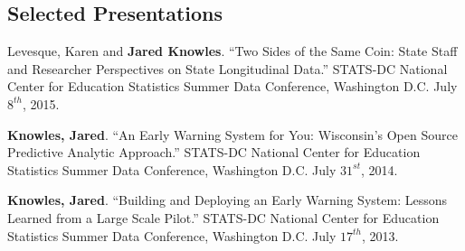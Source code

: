 \documentclass[margin,line]{res}
\begin{document}
\begin{resume}
\section{\sc Selected Presentations}

Levesque, Karen and \textbf{Jared Knowles}. ``Two Sides of the Same Coin: State 
Staff and Researcher Perspectives on State Longitudinal Data.'' STATS-DC National Center for Education Statistics Summer Data Conference, Washington D.C. July $8^{th}$, 2015.


\textbf{Knowles, Jared}. ``An Early Warning System for You: Wisconsin’s Open Source Predictive Analytic Approach.'' STATS-DC National Center for Education Statistics Summer Data Conference, Washington D.C. July $31^{st}$, 2014.


\textbf{Knowles, Jared}. ``Building and Deploying an Early Warning System: Lessons Learned from a Large Scale Pilot.'' STATS-DC National Center for Education Statistics Summer Data Conference, Washington D.C. July $17^{th}$, 2013.





\end{resume}
\end{document}
